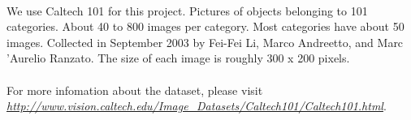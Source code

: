 \paragraph*{}
We use Caltech 101 for this project. Pictures of objects belonging to 101 categories. About 40 to 800 images per category. Most categories have about 50 images. Collected in September 2003 by Fei-Fei Li, Marco Andreetto, and Marc 'Aurelio Ranzato.  The size of each image is roughly 300 x 200 pixels.

\paragraph*{}
For more infomation about the dataset, please visit \textit{\url{http://www.vision.caltech.edu/Image_Datasets/Caltech101/Caltech101.html}}.